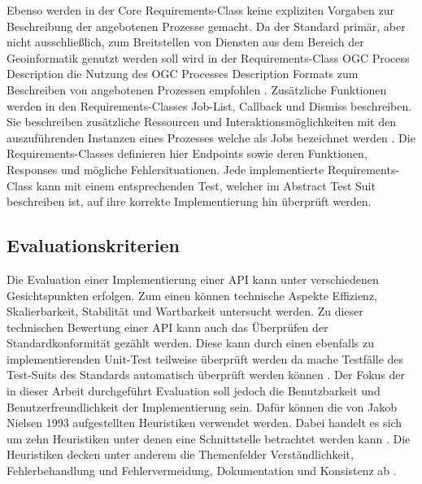 Ebenso werden in der Core Requirements-Class keine expliziten Vorgaben zur Beschreibung der angebotenen Prozesse gemacht. Da der Standard primär, aber nicht
ausschließlich, zum Breitstellen von Diensten aus dem Bereich der Geoinformatik genutzt werden soll wird in der Requirements-Class OGC Process Description die Nutzung des 
OGC Processes Description Formats zum Beschreiben von angebotenen Prozessen empfohlen \cite{ogc_api_processes_core}. 
Zusätzliche Funktionen werden in den Requirements-Classes Job-List, Callback und Dismiss beschreiben. Sie beschreiben zusätzliche Ressourcen und Interaktionsmöglichkeiten 
mit den auszuführenden Instanzen eines Prozesses welche als Jobs bezeichnet werden \cite{ogc_api_processes_core}.
Die Requirements-Classes definieren hier Endpoints sowie deren Funktionen, Responses und mögliche Fehlersituationen. Jede implementierte Requirements-Class kann mit einem 
entsprechenden Test, welcher im Abstract Test Suit beschreiben ist, auf ihre korrekte Implementierung hin überprüft werden. 
\subsection{Evaluationskriterien}
Die Evaluation einer Implementierung einer API kann unter verschiedenen Gesichtspunkten erfolgen. Zum einen können technische Aspekte Effizienz, Skalierbarkeit,
Stabilität und Wartbarkeit untersucht werden. Zu dieser technischen Bewertung einer API kann auch das Überprüfen der Standardkonformität gezählt werden. 
Diese kann durch einen ebenfalls zu implementierenden Unit-Test teilweise überprüft werden da mache Testfälle des Test-Suits des Standards automatisch überprüft
werden können \cite{ogc_api_processes_core}. Der Fokus der in dieser Arbeit durchgeführt Evaluation soll jedoch die Benutzbarkeit und Benutzerfreundlichkeit der 
Implementierung sein. Dafür können die von Jakob Nielsen 1993 aufgestellten Heuristiken verwendet werden. Dabei handelt es sich um zehn Heuristiken unter denen 
eine Schnittstelle betrachtet werden kann \cite{usability_engineering}. Die Heuristiken decken unter anderem die Themenfelder Verständlichkeit, Fehlerbehandlung und 
Fehlervermeidung, Dokumentation und Konsistenz ab \cite{usability_engineering}. 




